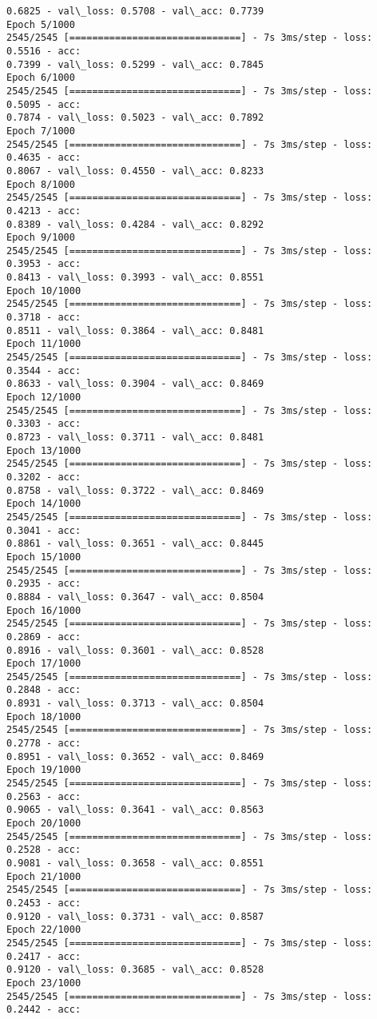 \documentclass[11pt]{article}
\begin{document}
\begin{Verbatim}[commandchars=\\\{\}]
0.6825 - val\_loss: 0.5708 - val\_acc: 0.7739
Epoch 5/1000
2545/2545 [==============================] - 7s 3ms/step - loss: 0.5516 - acc:
0.7399 - val\_loss: 0.5299 - val\_acc: 0.7845
Epoch 6/1000
2545/2545 [==============================] - 7s 3ms/step - loss: 0.5095 - acc:
0.7874 - val\_loss: 0.5023 - val\_acc: 0.7892
Epoch 7/1000
2545/2545 [==============================] - 7s 3ms/step - loss: 0.4635 - acc:
0.8067 - val\_loss: 0.4550 - val\_acc: 0.8233
Epoch 8/1000
2545/2545 [==============================] - 7s 3ms/step - loss: 0.4213 - acc:
0.8389 - val\_loss: 0.4284 - val\_acc: 0.8292
Epoch 9/1000
2545/2545 [==============================] - 7s 3ms/step - loss: 0.3953 - acc:
0.8413 - val\_loss: 0.3993 - val\_acc: 0.8551
Epoch 10/1000
2545/2545 [==============================] - 7s 3ms/step - loss: 0.3718 - acc:
0.8511 - val\_loss: 0.3864 - val\_acc: 0.8481
Epoch 11/1000
2545/2545 [==============================] - 7s 3ms/step - loss: 0.3544 - acc:
0.8633 - val\_loss: 0.3904 - val\_acc: 0.8469
Epoch 12/1000
2545/2545 [==============================] - 7s 3ms/step - loss: 0.3303 - acc:
0.8723 - val\_loss: 0.3711 - val\_acc: 0.8481
Epoch 13/1000
2545/2545 [==============================] - 7s 3ms/step - loss: 0.3202 - acc:
0.8758 - val\_loss: 0.3722 - val\_acc: 0.8469
Epoch 14/1000
2545/2545 [==============================] - 7s 3ms/step - loss: 0.3041 - acc:
0.8861 - val\_loss: 0.3651 - val\_acc: 0.8445
Epoch 15/1000
2545/2545 [==============================] - 7s 3ms/step - loss: 0.2935 - acc:
0.8884 - val\_loss: 0.3647 - val\_acc: 0.8504
Epoch 16/1000
2545/2545 [==============================] - 7s 3ms/step - loss: 0.2869 - acc:
0.8916 - val\_loss: 0.3601 - val\_acc: 0.8528
Epoch 17/1000
2545/2545 [==============================] - 7s 3ms/step - loss: 0.2848 - acc:
0.8931 - val\_loss: 0.3713 - val\_acc: 0.8504
Epoch 18/1000
2545/2545 [==============================] - 7s 3ms/step - loss: 0.2778 - acc:
0.8951 - val\_loss: 0.3652 - val\_acc: 0.8469
Epoch 19/1000
2545/2545 [==============================] - 7s 3ms/step - loss: 0.2563 - acc:
0.9065 - val\_loss: 0.3641 - val\_acc: 0.8563
Epoch 20/1000
2545/2545 [==============================] - 7s 3ms/step - loss: 0.2528 - acc:
0.9081 - val\_loss: 0.3658 - val\_acc: 0.8551
Epoch 21/1000
2545/2545 [==============================] - 7s 3ms/step - loss: 0.2453 - acc:
0.9120 - val\_loss: 0.3731 - val\_acc: 0.8587
Epoch 22/1000
2545/2545 [==============================] - 7s 3ms/step - loss: 0.2417 - acc:
0.9120 - val\_loss: 0.3685 - val\_acc: 0.8528
Epoch 23/1000
2545/2545 [==============================] - 7s 3ms/step - loss: 0.2442 - acc:

\end{Verbatim}
\end{document}
